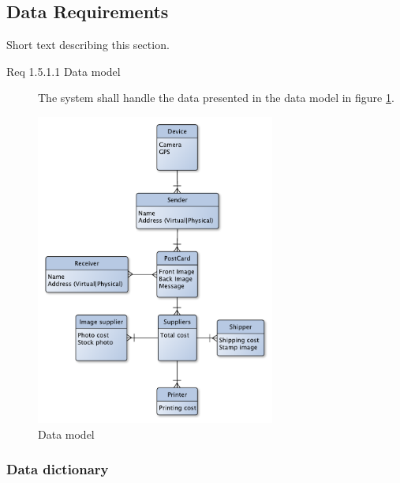 \documentclass[10pt,a4paper]{article}
\begin{document}
\subsection{Data Requirements}
Short text describing this section.

\begin {description}
\item[Req 1.5.1.1 Data model] The system shall handle the data presented in the data model in figure \ref{fig:datamodel}.
\end{description}

\begin{figure}[h!]
\centering
\includegraphics[width=0.7\textwidth]{Data_figures/DataModel.pdf}
\caption{Data model}
\label{fig:datamodel}
\end{figure}

\subsubsection{Data dictionary}

%
%
%
\end{document}
